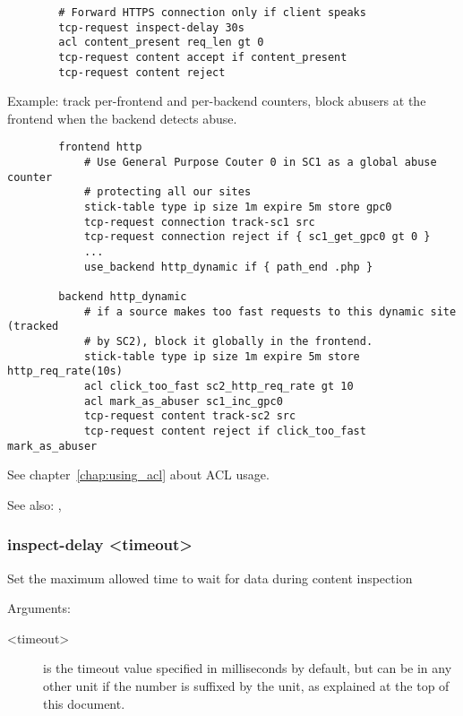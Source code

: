 {\begin{verbatim}
        # Forward HTTPS connection only if client speaks
        tcp-request inspect-delay 30s
        acl content_present req_len gt 0
        tcp-request content accept if content_present
        tcp-request content reject
  \end{verbatim}

  Example: track per-frontend and per-backend counters, block abusers at the
           frontend when the backend detects abuse.

  \begin{verbatim}
        frontend http
            # Use General Purpose Couter 0 in SC1 as a global abuse counter
            # protecting all our sites
            stick-table type ip size 1m expire 5m store gpc0
            tcp-request connection track-sc1 src
            tcp-request connection reject if { sc1_get_gpc0 gt 0 }
            ...
            use_backend http_dynamic if { path_end .php }

        backend http_dynamic
            # if a source makes too fast requests to this dynamic site (tracked
            # by SC2), block it globally in the frontend.
            stick-table type ip size 1m expire 5m store http_req_rate(10s)
            acl click_too_fast sc2_http_req_rate gt 10
            acl mark_as_abuser sc1_inc_gpc0
            tcp-request content track-sc2 src
            tcp-request content reject if click_too_fast mark_as_abuser
  \end{verbatim}

  See chapter~\ref{chap:using_acl} about ACL usage.

  See also: , 

\subsubsection[tcp-request inspect-delay]{ inspect-delay <timeout>}

  Set the maximum allowed time to wait for data during content inspection


  Arguments:
  \begin{description}
  \item[<timeout>] is the timeout value specified in milliseconds by default, but
              can be in any other unit if the number is suffixed by the unit,
              as explained at the top of this document.
  \end{description}

}
